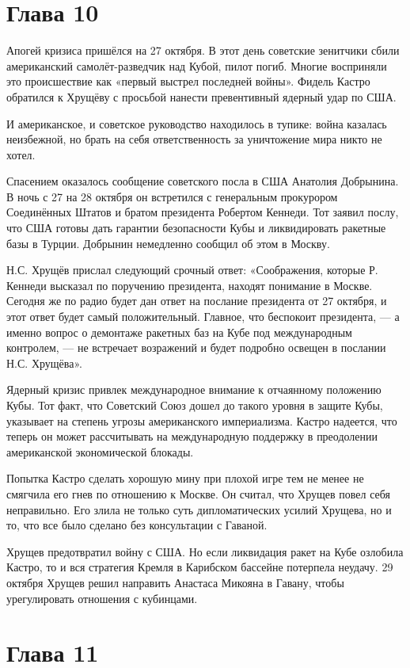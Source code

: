 \documentclass[14pt]{extreport}
\begin{document}
\section{Глава 10}

Апогей кризиса пришёлся на 27 октября. В этот день советские зенитчики сбили американский самолёт-разведчик над Кубой, пилот погиб. Многие восприняли это происшествие как «первый выстрел последней войны». Фидель Кастро обратился к Хрущёву с просьбой нанести превентивный ядерный удар по США.

И американское, и советское руководство находилось в тупике: война казалась неизбежной, но брать на себя ответственность за уничтожение мира никто не хотел.

Спасением оказалось сообщение советского посла в США Анатолия Добрынина. В ночь с 27 на 28 октября он встретился с генеральным прокурором Соединённых Штатов и братом президента Робертом Кеннеди. Тот заявил послу, что США готовы дать гарантии безопасности Кубы и ликвидировать ракетные базы в Турции. Добрынин немедленно сообщил об этом в Москву.

Н.С. Хрущёв прислал следующий срочный ответ: «Соображения, которые Р. Кеннеди высказал по поручению президента, находят понимание в Москве. Сегодня же по радио будет дан ответ на послание президента от 27 октября, и этот ответ будет самый положительный. Главное, что беспокоит президента, — а именно вопрос о демонтаже ракетных баз на Кубе под международным контролем, — не встречает возражений и будет подробно освещен в послании Н.С. Хрущёва».

Ядерный кризис привлек международное внимание к отчаянному положению Кубы. Тот факт, что Советский Союз дошел до такого уровня в защите Кубы, указывает на степень угрозы американского империализма. Кастро надеется, что теперь он может рассчитывать на международную поддержку в преодолении американской экономической блокады.

Попытка Кастро сделать хорошую мину при плохой игре тем не менее не смягчила его гнев по отношению к Москве. Он считал, что Хрущев повел себя неправильно. Его злила не только суть дипломатических усилий Хрущева, но и то, что все было сделано без консультации с Гаваной.

Хрущев предотвратил войну с США. Но если ликвидация ракет на Кубе озлобила Кастро, то и вся стратегия Кремля в Карибском бассейне потерпела неудачу. 29 октября Хрущев решил направить Анастаса Микояна в Гавану, чтобы урегулировать отношения с кубинцами.

\section{Глава 11}
\end{document}
